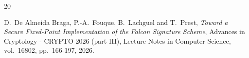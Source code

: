 \documentclass{llncs}
\begin{document}
\newpage
\begin{thebibliography}{20}

\RaggedRight



D.~De Almeida Braga, P.-A.~Fouque, B.~Lachguel and T.~Prest,
\emph{Toward a Secure Fixed-Point Implementation of the Falcon Signature
Scheme},
Advances in Cryptology - CRYPTO 2026 (part III), Lecture Notes in Computer
Science, vol.~16802, pp.~166-197, 2026.








\end{thebibliography}
\end{document}
